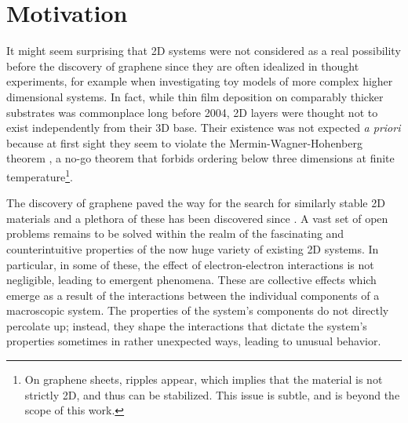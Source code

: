 \section{Motivation}
\label{sec:motivation}

It might seem surprising that \ac{2D} systems were not considered as a real possibility before the discovery of graphene since they are often idealized in thought experiments, for example when investigating toy models of more complex higher dimensional systems.
In fact, while thin film deposition on comparably thicker substrates was commonplace long before 2004, \ac{2D} layers were thought not to exist independently from their 3D base.
Their existence was not expected \emph{a priori} because at first sight they seem to violate the Mermin-Wagner-Hohenberg theorem \cite{mermin_absence_1966, coleman_there_1973, hohenberg_existence_1967}, a no-go theorem that forbids ordering below three dimensions at finite temperature\footnote{On graphene sheets, ripples appear, which implies that the material is not strictly \ac{2D}, and thus can be stabilized. This issue is subtle, and is beyond the scope of this work.}.

The discovery of graphene paved the way for the search for similarly stable \ac{2D} materials and a plethora of these has been discovered since \cite{ajayan_two-dimensional_2016}.
A vast set of open problems remains to be solved within the realm of the fascinating and counterintuitive properties of the now huge variety of existing \ac{2D} systems.
In particular, in some of these, the effect of electron-electron interactions is not negligible, leading to emergent phenomena.
These are collective effects which emerge as a result of the interactions between the individual components of a macroscopic system.
The properties of the system's components do not directly percolate up; instead, they shape the interactions that dictate the system's properties sometimes in rather unexpected ways, leading to unusual behavior.

